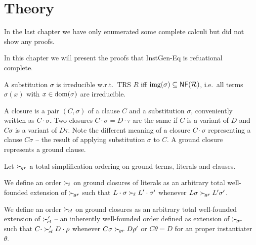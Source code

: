 
\chapter{Theory}

In the last chapter we have only enumerated some complete calculi but did not show any proofs.

In this chapter we will present the proofs that InstGen-Eq is refuational complete.




\begin{definition}
    A substitution $\sigma$ is irreducible w.r.t.~TRS $R$
    iff
    $\operatorname{img}(\sigma)\subseteq\mathsf{NF}({\mathcal R})$,
    i.e.~all terms $\sigma(x)$ with $x\in\operatorname{dom}(\sigma)$ are irreducible.
\end{definition}

\begin{definition}
    A closure is a pair $(C,\sigma)$ of a clause $C$ and a substitution $\sigma$,
    conveniently written as $C\cdot\sigma$. Two closures $C\cdot\sigma = D\cdot\tau$
    are the same if $C$ is a variant of $D$ and $C\sigma$ is a variant of $D\tau$.
    Note the different meaning of a closure $C\cdot\sigma$ representing a clause $C\sigma$
    -- the result of applying substitution $\sigma$ to $C$.
    A ground closure represents a ground clause.
\end{definition}

\begin{definition}
    \cite{NR2001}
\end{definition}

\begin{definition}
    Let $\mathrel\succ_{\!gr}$ a total simplification ordering on ground terms, literals and clauses.

    We define an order $\mathrel\succ_{\!\ell}$ on ground closures of literals
    as an arbitrary total well-founded extension of $\mathrel\succ_{\!gr}$
    such that
    $L\cdot\sigma\mathrel\succ_{\!\ell} L'\cdot\sigma'$ whenever
    $L\sigma\mathrel\succ_{\!gr} L'\sigma'$.

    We define an order $\mathrel\succ_{\!cl}$ on ground closures
    as an arbitrary total well-founded extension of
    $\mathrel\succ_{\!cl}'$ -- an inherently well-founded order defined as extension of $\mathrel\succ_{\!gr}$
    such that
    $C\cdot\mathrel\succ_{\!cl}' D\cdot\rho$ whenever
    $C\sigma\mathrel\succ_{\!gr} D\rho'$ or $C\theta = D$ for an proper instantiater $\theta$.
\end{definition}






